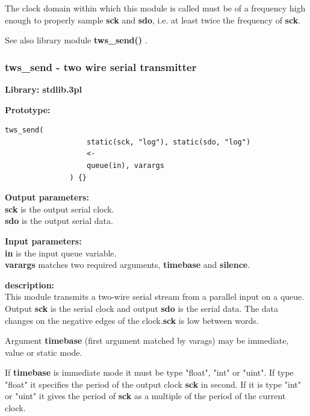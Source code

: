             The clock domain within which this module is called must be
            of a frequency high enough to properly sample {\bf sck} and
            {\bf sdo}, i.e. at least twice the frequency of {\bf sck}.

            See also library module {\bf tws\_send()} .



        \subsubsection{tws\_send - two wire serial transmitter}\label{sec:lmtwssend}

            {\bf Library: stdlib.3pl}


            {\bf Prototype:} \\
            \vsp
            \begin{lstlisting}[gobble=12, language=threepl]
               tws_send(
                   static(sck, "log"), static(sdo, "log")
                   <-
                   queue(in), varargs
               ) {}
            \end{lstlisting}

            {\bf Output parameters:} \\
            {\bf sck} is the output serial clock. \\
            {\bf sdo} is the output serial data.

            {\bf Input parameters:} \\
            {\bf in} is the input queue variable. \\
            {\bf varargs} matches two required arguments, {\bf timebase} and
            {\bf silence}.

            {\bf description:} \\
            This module transmits a two-wire serial stream from
            a parallel input on a queue. Output {\bf sck} is the serial clock
            and output {\bf sdo} is the serial data. The data changes
            on the negative edges of the clock.{\bf sck} is low between
            words.

            Argument {\bf timebase} (first argument matched by varags)
            may be immediate, value or static mode.
            
            If {\bf timebase} is immediate mode it must be type "float", "int"
            or "uint". If type "float" it specifies the period of the output
            clock {\bf sck} in second. If it is type "int" or "uint" it gives
            the period of {\bf sck} as a multiple of the period of the
            current clock.
            
